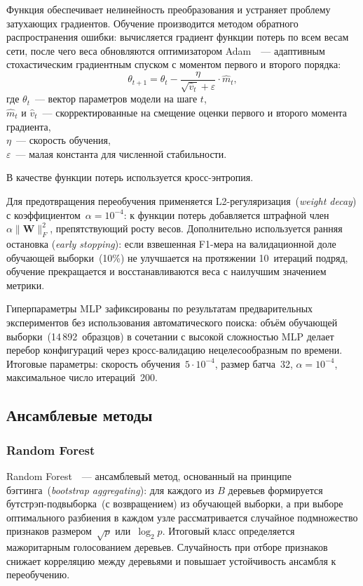 Функция обеспечивает нелинейность преобразования и устраняет проблему затухающих градиентов. Обучение производится методом обратного распространения ошибки: вычисляется градиент функции потерь по всем весам сети, после чего веса обновляются оптимизатором Adam~\cite{adam_optimizer}~--- адаптивным стохастическим градиентным спуском с моментом первого и второго порядка:
\begin{equation}\label{eq:adam}
    \theta_{t+1} = \theta_t - \frac{\eta}{\sqrt{\hat{v}_t} + \varepsilon} \cdot \hat{m}_t,
\end{equation}
где $\theta_t$~--- вектор параметров модели на шаге $t$, \\ $\hat{m}_t$ и $\hat{v}_t$~--- скорректированные на смещение оценки первого и второго момента градиента, \\ $\eta$~--- скорость обучения, \\ $\varepsilon$~--- малая константа для численной стабильности.

В качестве функции потерь используется кросс-энтропия.

Для предотвращения переобучения применяется L2-регуляризация~(\textit{weight decay}) с коэффициентом~$\alpha = 10^{-4}$: к функции потерь добавляется штрафной член $\alpha \|\mathbf{W}\|_F^2$, препятствующий росту весов. Дополнительно используется ранняя остановка (\textit{early stopping}): если взвешенная F1-мера на валидационной доле обучающей выборки~(10\%) не улучшается на протяжении 10~итераций подряд, обучение прекращается и восстанавливаются веса с наилучшим значением метрики.

Гиперпараметры MLP зафиксированы по результатам предварительных экспериментов без использования автоматического поиска: объём обучающей выборки~(14\,892~образцов) в сочетании с высокой сложностью MLP делает перебор конфигураций через кросс-валидацию нецелесообразным по времени. Итоговые параметры: скорость обучения~$5 \cdot 10^{-4}$, размер батча~32, $\alpha = 10^{-4}$, максимальное число итераций~200.

\subsection{Ансамблевые методы}

\subsubsection{Random Forest}

Random Forest~\cite{scikit_learn}~--- ансамблевый метод, основанный на принципе бэггинга~(\textit{bootstrap aggregating}): для каждого из $B$ деревьев формируется бутстрэп-подвыборка~(с возвращением) из обучающей выборки, а при выборе оптимального разбиения в каждом узле рассматривается случайное подмножество признаков размером~$\sqrt{p}$ или~$\log_2 p$. Итоговый класс определяется мажоритарным голосованием деревьев. Случайность при отборе признаков снижает корреляцию между деревьями и повышает устойчивость ансамбля к переобучению.

